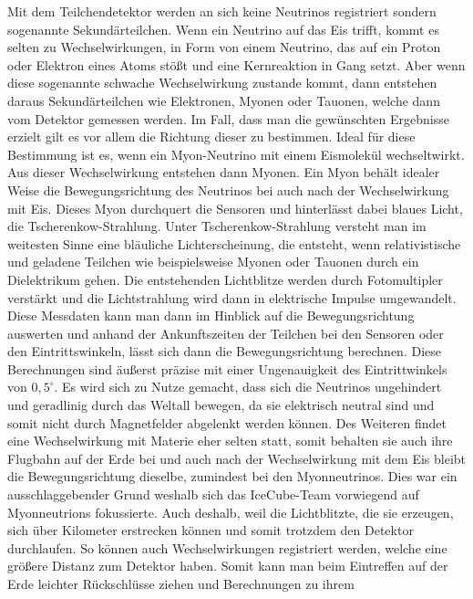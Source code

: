     Mit dem Teilchendetektor werden an sich keine Neutrinos registriert sondern sogenannte Sekundärteilchen. 
    Wenn ein Neutrino auf das Eis trifft, kommt es selten zu Wechselwirkungen, in Form von einem Neutrino, 
    das auf ein Proton oder Elektron eines Atoms stößt und eine Kernreaktion in Gang setzt. Aber wenn diese 
    sogenannte schwache Wechselwirkung zustande kommt, dann entstehen daraus Sekundärteilchen wie Elektronen, 
    Myonen oder Tauonen, welche dann vom Detektor gemessen werden. Im Fall, dass man die gewünschten Ergebnisse 
    erzielt gilt es vor allem die Richtung dieser zu bestimmen. Ideal für diese Bestimmung ist es, wenn ein 
    Myon-Neutrino mit einem Eismolekül wechseltwirkt. Aus dieser Wechselwirkung entstehen dann Myonen. 
    Ein Myon behält idealer Weise die Bewegungsrichtung des Neutrinos bei auch nach der Wechselwirkung mit Eis. 
    Dieses Myon durchquert die Sensoren und hinterlässt dabei blaues Licht, die Tscherenkow-Strahlung. 
    Unter Tscherenkow-Strahlung versteht man im weitesten Sinne eine bläuliche Lichterscheinung, die entsteht, 
    wenn relativistische und geladene Teilchen wie beispielsweise Myonen oder Tauonen durch ein Dielektrikum 
    gehen. Die entstehenden Lichtblitze werden durch Fotomultipler verstärkt und die Lichtstrahlung wird dann 
    in elektrische Impulse umgewandelt. Diese Messdaten kann man dann im Hinblick auf die Bewegungsrichtung 
    auswerten und anhand der Ankunftszeiten der Teilchen bei den Sensoren oder den Eintrittswinkeln, lässt 
    sich dann die Bewegungsrichtung berechnen. Diese Berechnungen sind äußerst präzise mit einer Ungenauigkeit 
    des Eintrittwinkels von $0,5^\circ$. Es wird sich zu Nutze gemacht, dass sich die Neutrinos ungehindert und 
    geradlinig durch das Weltall bewegen, da sie elektrisch neutral sind und somit nicht durch Magnetfelder 
    abgelenkt werden können. Des Weiteren findet eine Wechselwirkung mit Materie eher selten statt, somit 
    behalten sie auch ihre Flugbahn auf der Erde bei und auch nach der Wechselwirkung mit dem Eis bleibt die 
    Bewegungsrichtung dieselbe, zumindest bei den Myonneutrinos. Dies war ein ausschlaggebender Grund weshalb 
    sich das IceCube-Team vorwiegend auf Myonneutrions fokussierte. Auch deshalb, weil die Lichtblitzte, 
    die sie erzeugen, sich über Kilometer erstrecken können und somit trotzdem den Detektor durchlaufen. 
    So können auch Wechselwirkungen registriert werden, welche eine größere Distanz zum Detektor haben. 
    Somit kann man beim Eintreffen auf der Erde leichter Rückschlüsse ziehen und Berechnungen zu ihrem 
